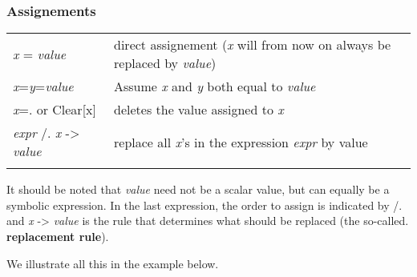 \subsubsection{Assignements}
\begin{tabular}{>{\hfill}p{5cm}p{12cm}}
	\textit{x} = \textit{value}		&	direct assignement (\textit{x} will from now on always be replaced by \textit{value})\\
	\textit{x}=\textit{y}=\textit{value}		&	Assume \textit{x} and \textit{y} both equal to \textit{value}\\
	\textit{x}=. or Clear[x]		&	deletes the value assigned to \textit{x}\\
	\textit{expr} /. \textit{x} -> \textit{value}	&	replace all \textit{x}'s in the expression \textit{expr} by value\\
	\multicolumn{2}{l}{} 
\end{tabular}

It should be noted that \textit{value} need not be a scalar value, but can equally be a symbolic expression.
In the last expression, the order to assign is indicated by /. and \textit{x} -> \textit{value} is the rule that determines what should be replaced (the so-called. \textbf{replacement rule}).

We illustrate all this in the example below. 

